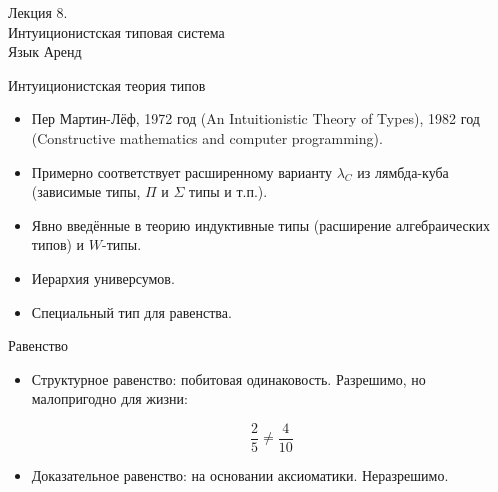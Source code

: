 \documentclass[aspectratio=169]{beamer}
\begin{document}
\newtheorem{dfn}{Определение}[section]
\newtheorem{nte}{Замечание}[section]

\newtheorem{axiom}{Аксиома}[section]
\newtheorem{thm}{Теорема}[section]
\newtheorem{lmm}[theorem]{Лемма}
\newtheorem{statement}{Утверждение}[section]
\newtheorem{oun_paragraph}{Пункт}[section]
\newtheorem{cons}{Следствие}[section]
\newtheorem*{exm}{Пример}

\newcommand{\comb}[1]{\operatorname{\bf{\textrm{#1}}}}
\newcommand{\func}[1]{\operatorname{#1}}
\newcommand{\reduction}[1]{{\color{OrangeRed}#1}}
\newcommand{\set}[1]{\left\{#1\right\}}

\def\from#1{\par \parbox{0.7\textwidth}{\par \hfill\raggedleft \it #1}} 

\begin{frame}{}
\begin{center}\Large Лекция 8.\\Интуиционистская типовая система\\Язык Аренд\end{center}
\end{frame}


\begin{frame}{Интуиционистская теория типов}
\begin{itemize}
\item Пер Мартин-Лёф, 1972 год (An Intuitionistic Theory of Types), 
1982 год (Constructive mathematics and computer programming).
\item Примерно соответствует расширенному варианту $\lambda_C$ из лямбда-куба
(зависимые типы, $\Pi$ и $\Sigma$ типы и т.п.).
\item Явно введённые в теорию индуктивные типы (расширение алгебраических типов) и $W$-типы.
\item Иерархия универсумов.
\item Специальный тип для равенства.
\end{itemize}
\end{frame}

\begin{frame}{Равенство}

\begin{itemize}
\item Структурное равенство: побитовая одинаковость.
Разрешимо, но малопригодно для жизни:

$$\frac{2}{5} \ne \frac{4}{10}$$\vspace{0.5cm}

\item Доказательное равенство: на основании аксиоматики. Неразрешимо.
\end{itemize}
\end{frame}
\end{document}
